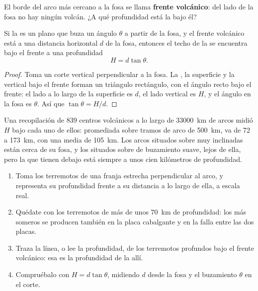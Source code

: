 El borde del arco más cercano a la fosa se llama \textbf{frente volcánico}:
del lado de la fosa no hay ningún volcán. ¿A qué profundidad está la 
bajo él?

\begin{proposition}\label{prop:g12:subduction-magmatism:depth}
Si la  es un plano que buza un ángulo $\theta$ a partir de la fosa, y el
frente volcánico está a una distancia horizontal $d$ de la fosa, entonces el
techo de la  se encuentra bajo el frente a una profundidad
\[
  H = d \tan\theta .
\]
\end{proposition}

\begin{proof}
Toma un corte vertical perpendicular a la fosa. La , la superficie y la
vertical bajo el frente forman un triángulo rectángulo, con el ángulo recto
bajo el frente: el lado a lo largo de la superficie es $d$, el lado vertical
es $H$, y el ángulo en la fosa es $\theta$. Así que $\tan\theta = H/d$.
\end{proof}

Una recopilación de 839 centros volcánicos a lo largo de \qty{33000}{km} de
arcos midió $H$ bajo cada uno de ellos: promediada sobre tramos de arco de
\qty{500}{km}, va de 72 a \qty{173}{km}, con una media de \qty{105}{km}. Los
arcos situados sobre  muy inclinadas están cerca de su fosa, y los
situados sobre  de buzamiento suave, lejos de ella, pero la  que
tienen debajo está siempre a unos cien kilómetros de profundidad.

\begin{method}\label{met:g12:subduction-magmatism:slab}
\begin{enumerate}
  \item Toma los terremotos de una franja estrecha perpendicular al arco, y
        representa su profundidad frente a su distancia a lo largo de ella, a
        escala real.
  \item Quédate con los terremotos de más de unos \qty{70}{km} de
        profundidad: los más someros se producen también en la placa
        cabalgante y en la falla entre las dos placas.
  \item Traza la línea, o lee la profundidad, de los terremotos profundos bajo
        el frente volcánico: esa es la profundidad de la  allí.
  \item Compruébalo con $H = d\tan\theta$, midiendo $d$ desde la fosa y el
        buzamiento $\theta$ en el corte.
\end{enumerate}
\end{method}

